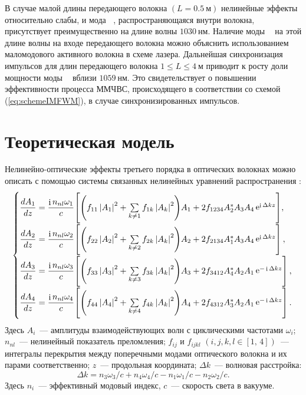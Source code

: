 \documentclass{article}
\DeclareMathOperator{\LPii}{\text{LP}_{\text{11}}}
\DeclareMathOperator{\im}{i}
\DeclareMathOperator{\e}{e}
\begin{document}
	В случае малой длины передающего волокна $\left(L=0.5~\text{м}\right)$ нелинейные эффекты относительно слабы, и мода $\LPii$, распространяющаяся внутри волокна, присутствует преимущественно на длине волны $1030~\text{нм}$. Наличие моды $\LPii$ на этой длине волны на входе передающего волокна можно объяснить использованием маломодового активного волокна в схеме лазера. Дальнейшая синхронизация импульсов для длин передающего волокна $1 \leq L \leq 4~\text{м}$ приводит к росту доли мощности моды $\LPii$ вблизи $1059~\text{нм}$. Это свидетельствует о повышении эффективности процесса ММЧВС, происходящего в соответствии со схемой (\ref{eq:schemeIMFWM}), в случае синхронизированных импульсов.
	
	\section{Теоретическая модель}
	
	Нелинейно-оптические эффекты третьего порядка в оптических волокнах можно описать с помощью системы связанных нелинейных уравнений распространения \cite{agrawal2000nonlinear}:
	\begin{equation}
		\resizebox{0.99\textwidth}{!}{$%
			\left\{\begin{array}{@{}l@{}}
				\dfrac{dA_1}{dz}=\dfrac{\im n_{nl} \omega_1}{c}\!\left[\left(f_{11}\left|A_1\right|^2+\sum\limits_{k\neq1}f_{1k}\left|A_k\right|^2\right)\!A_1+2f_{1234}A_2^{\ast}A_3A_4\e^{\im \Delta k z}\right]\!, \vspace{0.05cm} \\ 
				\dfrac{dA_2}{dz}=\dfrac{\im n_{nl} \omega_2}{c}\!\left[\left(f_{22}\left|A_2\right|^2+\sum\limits_{k\neq2}f_{2k}\left|A_k\right|^2\right)\!A_2+2f_{2134}A_1^{\ast}A_3A_4\e^{\im \Delta k z}\right], \vspace{0.05cm} \\
				\dfrac{dA_3}{dz}=\dfrac{\im n_{nl} \omega_3}{c}\!\left[\left(f_{33}\left|A_3\right|^2+\sum\limits_{k\neq3}f_{3k}\left|A_k\right|^2\right)\!A_3+2f_{3412}A_4^{\ast}A_2A_1\e^{-\im \Delta k z}\right], \vspace{0.05cm} \\
				\dfrac{dA_4}{dz}=\dfrac{\im n_{nl} \omega_4}{c}\!\left[\left(f_{44}\left|A_4\right|^2+\sum\limits_{k\neq4}f_{4k}\left|A_k\right|^2\right)\!A_4+2f_{4312}A_3^{\ast}A_2A_1\e^{-\im \Delta k z}\right].
			\end{array}\right.\,$%
		}
		\label{eq:mainEQ}
	\end{equation}
	Здесь $A_{{i}}$~--- амплитуды взаимодействующих волн с циклическими частотами $\omega_i$; $n_{nl}$~--- нелинейный показатель преломления; $f_{ij}\text{ и }f_{ijkl}$ $\left(i,j,k,l\in\left[1,\,4\right]\right)$~--- интегралы перекрытия между поперечными модами оптического волокна и их парами соответственно; $z$~--- продольная координата; $\Delta k$~--- волновая расстройка:
	\begin{equation}
		\Delta k ={{n_3}\omega_3}/{c}+{{n_4}\omega_4}/{c}-{{n_1}\omega_1}/{c}-{{n_2}\omega_2}/{c}.
		\label{eq:deltaK}
	\end{equation}
	Здесь ${n_{i}}$~--- эффективный модовый индекс, $c$~--- скорость света в вакууме.
	
\end{document}
